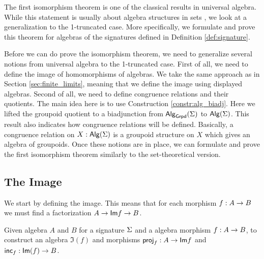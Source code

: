 The first isomorphism theorem is one of the classical results in universal algebra.
While this statement is usually about algebra structures in sets \cite{lynge2019}, we look at a generalization to the 1-truncated case.
More specifically, we formulate and prove this theorem for algebras of the signatures defined in Definition \ref{def:signature}.

Before we can do prove the isomorphism theorem, we need to generalize several notions from universal algebra to the 1-truncated case.
First of all, we need to define the image of homomorphisms of algebras.
We take the same approach as in Section \ref{sec:finite_limits}, meaning that we define the image using displayed algebras.
Second of all, we need to define congruence relations and their quotients.
The main idea here is to use Construction \ref{constr:alg_biadj}.
Here we lifted the groupoid quotient to a biadjunction from $\mathsf{Alg}_{\mathsf{Grpd}}(\Sigma)$ to $\mathsf{Alg}(\Sigma)$.
This result also indicates how congruence relations will be defined.
Basically, a congruence relation on $X : \mathsf{Alg}(\Sigma)$ is a groupoid structure on $X$ which gives an algebra of groupoids.
Once these notions are in place, we can formulate and prove the first isomorphism theorem similarly to the set-theoretical version.

\subsection{The Image}
We start by defining the image.
This means that for each morphism $f : A \rightarrow B$ we must find a factorization $A \rightarrow \mathsf{Im}{f} \rightarrow B$.

\begin{problem}
\label{prob:image}
Given algebra $A$ and $B$ for a signature $\Sigma$ and a algebra morphism $f : A \rightarrow B$,
to construct an algebra $\Im(f)$ and morphisms $\mathsf{proj}_{f} : A \rightarrow \mathsf{Im}{f}$ and $\mathsf{inc}_{f} : \mathsf{Im}(f) \rightarrow B$. 
\end{problem}

